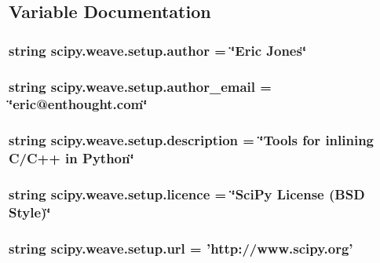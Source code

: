 \subsection{Variable Documentation}
\hypertarget{namespacescipy_1_1weave_1_1setup_a8beac4f816486fbd7b744d51c6294339}{}
\subsubsection[{author}]{\setlength{\rightskip}{0pt plus 5cm}string scipy.\+weave.\+setup.\+author = \char`\"{}Eric Jones\char`\"{}}\label{namespacescipy_1_1weave_1_1setup_a8beac4f816486fbd7b744d51c6294339}
\hypertarget{namespacescipy_1_1weave_1_1setup_a313bcae18b6012b2324ba64d9805c3f9}{}
\subsubsection[{author\+\_\+email}]{\setlength{\rightskip}{0pt plus 5cm}string scipy.\+weave.\+setup.\+author\+\_\+email = \char`\"{}eric@enthought.\+com\char`\"{}}\label{namespacescipy_1_1weave_1_1setup_a313bcae18b6012b2324ba64d9805c3f9}
\hypertarget{namespacescipy_1_1weave_1_1setup_a6a57337ab5b06191aa66e10c2a2cfc7f}{}
\subsubsection[{description}]{\setlength{\rightskip}{0pt plus 5cm}string scipy.\+weave.\+setup.\+description = \char`\"{}Tools for inlining C/C++ in Python\char`\"{}}\label{namespacescipy_1_1weave_1_1setup_a6a57337ab5b06191aa66e10c2a2cfc7f}
\hypertarget{namespacescipy_1_1weave_1_1setup_af8045dd0e347324719122648b6f9159c}{}
\subsubsection[{licence}]{\setlength{\rightskip}{0pt plus 5cm}string scipy.\+weave.\+setup.\+licence = \char`\"{}Sci\+Py License (B\+S\+D Style)\char`\"{}}\label{namespacescipy_1_1weave_1_1setup_af8045dd0e347324719122648b6f9159c}
\hypertarget{namespacescipy_1_1weave_1_1setup_a0a62c1c29ffcb7096efeb467a10e573d}{}
\subsubsection[{url}]{\setlength{\rightskip}{0pt plus 5cm}string scipy.\+weave.\+setup.\+url = 'http\+://www.\+scipy.\+org'}\label{namespacescipy_1_1weave_1_1setup_a0a62c1c29ffcb7096efeb467a10e573d}
